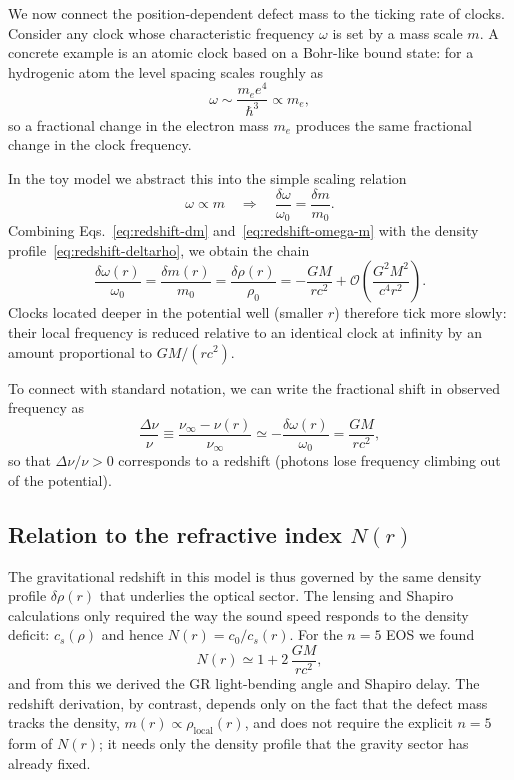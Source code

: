 \documentclass[11pt]{article}
\begin{document}
We now connect the position-dependent defect mass to the ticking rate of
clocks.
Consider any clock whose characteristic frequency $\omega$ is set by a mass
scale $m$.
A concrete example is an atomic clock based on a Bohr-like bound state:
for a hydrogenic atom the level spacing scales roughly as
\begin{equation}
  \omega \sim \frac{m_e e^4}{\hbar^3}
  \propto m_e,
\end{equation}
so a fractional change in the electron mass $m_e$ produces the same
fractional change in the clock frequency.

In the toy model we abstract this into the simple scaling relation
\begin{equation}
  \omega \propto m
  \quad\Rightarrow\quad
  \frac{\delta\omega}{\omega_0}
  = \frac{\delta m}{m_0}.
  \label{eq:redshift-omega-m}
\end{equation}
Combining Eqs.~\eqref{eq:redshift-dm} and~\eqref{eq:redshift-omega-m} with
the density profile~\eqref{eq:redshift-deltarho}, we obtain the chain
\begin{equation}
  \frac{\delta\omega(r)}{\omega_0}
  = \frac{\delta m(r)}{m_0}
  = \frac{\delta\rho(r)}{\rho_0}
  = -\frac{GM}{r c^2}
  + \mathcal{O}\!\left(\frac{G^2M^2}{c^4 r^2}\right).
  \label{eq:redshift-full-chain}
\end{equation}
Clocks located deeper in the potential well (smaller $r$) therefore tick
more slowly: their local frequency is reduced relative to an identical
clock at infinity by an amount proportional to $GM/(r c^2)$.

To connect with standard notation, we can write the fractional shift in
observed frequency as
\begin{equation}
  \frac{\Delta\nu}{\nu}
  \equiv \frac{\nu_{\infty} - \nu(r)}{\nu_{\infty}}
  \simeq -\frac{\delta\omega(r)}{\omega_0}
  = \frac{GM}{r c^2},
\end{equation}
so that $\Delta\nu/\nu > 0$ corresponds to a redshift (photons lose
frequency climbing out of the potential).


\subsection{Relation to the refractive index \texorpdfstring{$N(r)$}{N(r)}}
\label{subsec:redshift-N}

The gravitational redshift in this model is thus governed by the same
density profile $\delta\rho(r)$ that underlies the optical sector.
The lensing and Shapiro calculations only required the way the sound speed
responds to the density deficit: $c_s(\rho)$ and hence
$N(r) = c_0 / c_s(r)$.
For the $n=5$ EOS we found
\begin{equation}
  N(r)
  \simeq 1 + 2\,\frac{GM}{r c^2},
\end{equation}
and from this we derived the GR light-bending angle and Shapiro delay.
The redshift derivation, by contrast, depends only on the fact that the
defect mass tracks the density,
$m(r) \propto \rho_{\text{local}}(r)$, and does not require the explicit
$n=5$ form of $N(r)$; it needs only the density profile that the gravity
sector has already fixed.
\end{document}
